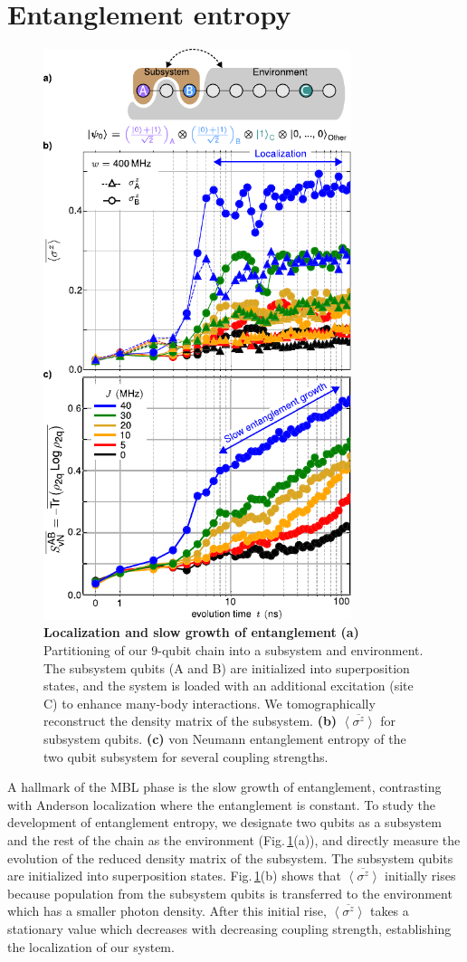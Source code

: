 \section{Entanglement entropy}
\begin{figure}[t]
 \centering
 \includegraphics[width=90mm]{./PDF/fig_4.pdf}
 \caption{
 \textbf{Localization and slow growth of entanglement}
 \textbf{(a)} Partitioning of our 9-qubit chain into a subsystem and environment.
 The subsystem qubits (A and B) are initialized into superposition states, and the system is loaded with an additional excitation (site C) to enhance many-body interactions. We tomographically reconstruct the  density matrix of the subsystem. \textbf{(b)} $\overline{\left< \sigma^z \right>}$ for subsystem qubits. \textbf{(c)} von Neumann entanglement entropy of the two qubit subsystem for several coupling strengths.}
 \label{ch5:entanglement_entropy}
\end{figure}
A hallmark of the MBL phase is the slow growth of entanglement, contrasting with Anderson localization where the entanglement is constant. To study the development of entanglement entropy, we designate two qubits as a subsystem and the rest of the chain as the environment (Fig.\,\ref{ch5:entanglement_entropy}(a)), and directly measure the evolution of the reduced density matrix of the subsystem. The subsystem qubits are initialized into superposition states. Fig.\,\ref{ch5:entanglement_entropy}(b) shows that $\overline{ \left< \sigma^z \right> }$ initially rises because population from the subsystem qubits is transferred to the environment which has a smaller photon density. After this initial rise, $\overline{ \left< \sigma^z \right> }$ takes a stationary value which decreases with decreasing coupling strength, establishing the localization of our system.

